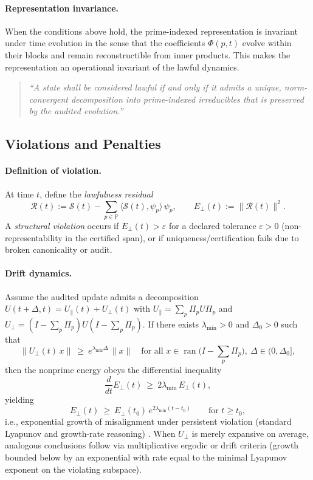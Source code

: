 \documentclass[12pt]{amsart}
\theoremstyle{plain}
\begin{document}
\paragraph{Representation invariance.}
When the conditions above hold, the prime-indexed representation is invariant under time evolution in the sense that the coefficients $\Phi(p,t)$ evolve within their blocks and remain reconstructible from inner products. This makes the representation an operational invariant of the lawful dynamics.

\begin{quote}
\textit{“A state shall be considered lawful if and only if it admits a unique, norm-convergent decomposition into prime-indexed irreducibles that is preserved by the audited evolution.”}
\end{quote}

\subsection{Violations and Penalties}

\paragraph{Definition of violation.}
At time $t$, define the \emph{lawfulness residual}
\[
\mathcal{R}(t):=\mathcal{S}(t)-\sum_{p\in\mathbb{P}}\langle \mathcal{S}(t),\psi_p\rangle\,\psi_p,
\qquad
E_\perp(t):=\|\mathcal{R}(t)\|^{2}.
\]
A \emph{structural violation} occurs if $E_\perp(t)>\varepsilon$ for a declared tolerance $\varepsilon>0$ (non-representability in the certified span), or if uniqueness/certification fails due to broken canonicality or audit.

\paragraph{Drift dynamics.}
Assume the audited update admits a decomposition $U(t+\Delta,t)=U_{\parallel}(t)+U_{\perp}(t)$ with $U_{\parallel}=\sum_{p}\Pi_p U \Pi_p$ and $U_{\perp}=(I-\sum_p \Pi_p)U(I-\sum_p \Pi_p)$. If there exists $\lambda_{\min}>0$ and $\Delta_0>0$ such that
\[
\|U_{\perp}(t)\,x\|\ \ge\ e^{\lambda_{\min}\Delta}\,\|x\|
\quad\text{for all }x\in\operatorname{ran}\!\Big(I-\sum_p\Pi_p\Big),\ \Delta\in(0,\Delta_0],
\]
then the nonprime energy obeys the differential inequality
\[
\frac{d}{dt}E_\perp(t)\ \ge\ 2\lambda_{\min}\,E_\perp(t),
\]
yielding
\[
E_\perp(t)\ \ge\ E_\perp(t_0)\,e^{2\lambda_{\min}(t-t_0)}\qquad\text{for }t\ge t_0,
\]
i.e., exponential growth of misalignment under persistent violation (standard Lyapunov and growth-rate reasoning) \cite[Ch.\,4]{khalil2002nonlinear}. When $U_{\perp}$ is merely expansive on average, analogous conclusions follow via multiplicative ergodic or drift criteria (growth bounded below by an exponential with rate equal to the minimal Lyapunov exponent on the violating subspace).
\end{document}
